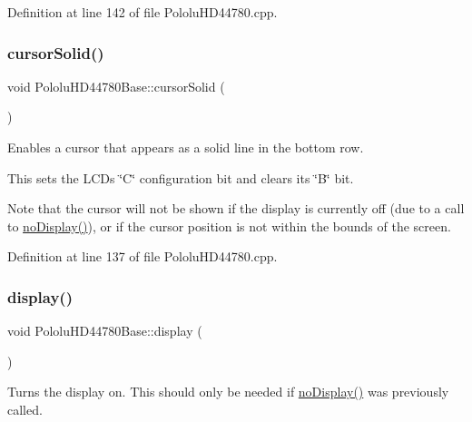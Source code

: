 Definition at line 142 of file Pololu\+H\+D44780.\+cpp.

\mbox{\label{class_pololu_h_d44780_base_a6a4d8e79beda9f7c81659a8e13c8c338}} 
\subsubsection{\texorpdfstring{cursor\+Solid()}{cursorSolid()}}
{\footnotesize\ttfamily void Pololu\+H\+D44780\+Base\+::cursor\+Solid (\begin{DoxyParamCaption}{ }\end{DoxyParamCaption})\hspace{0.3cm}{\ttfamily [inherited]}}

Enables a cursor that appears as a solid line in the bottom row.

This sets the L\+CD\textquotesingle{}s \char`\"{}\+C\char`\"{} configuration bit and clears its \char`\"{}\+B\char`\"{} bit.

Note that the cursor will not be shown if the display is currently off (due to a call to \hyperlink{class_pololu_h_d44780_base_abc2d4e126017565c2a0cf2aac67870a0}{no\+Display()}), or if the cursor position is not within the bounds of the screen. 

Definition at line 137 of file Pololu\+H\+D44780.\+cpp.

\mbox{\label{class_pololu_h_d44780_base_af5dd1e137bfe9310a418924b7483fcdf}} 
\subsubsection{\texorpdfstring{display()}{display()}}
{\footnotesize\ttfamily void Pololu\+H\+D44780\+Base\+::display (\begin{DoxyParamCaption}{ }\end{DoxyParamCaption})\hspace{0.3cm}{\ttfamily [inherited]}}

Turns the display on. This should only be needed if \hyperlink{class_pololu_h_d44780_base_abc2d4e126017565c2a0cf2aac67870a0}{no\+Display()} was previously called. 

